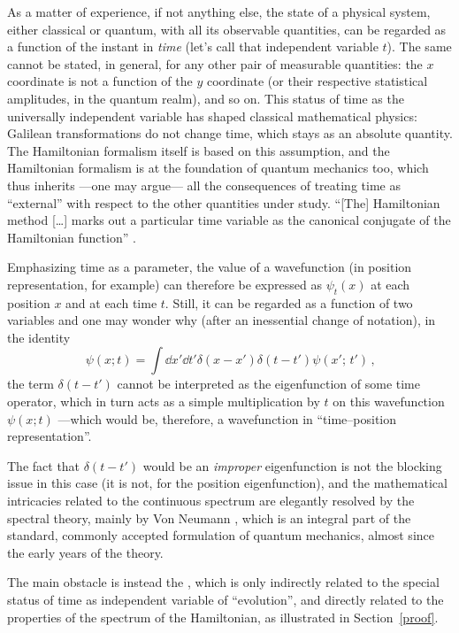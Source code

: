 As a matter of experience, if not anything else,
the state of a physical system, either classical or quantum,
with all its observable quantities,
can be regarded as a function of the instant in \emph{time}
(let's call that independent variable $t$).
The same cannot be stated, in general, for any other pair of measurable quantities:
the $x$ coordinate is not a function of the $y$ coordinate
(or their respective statistical amplitudes, in the quantum realm),
and so on.
This status of time as the universally independent variable
has shaped classical mathematical physics: Galilean transformations
do not change time, which stays as an absolute quantity.
The Hamiltonian formalism itself is based on this assumption,
and the Hamiltonian formalism is at the foundation of quantum mechanics too,
which thus inherits ---one may argue--- all the consequences of
treating time as ``external'' with respect to the other quantities under study.
``[The] Hamiltonian method [\dots] marks out a particular time variable
as the canonical conjugate of the Hamiltonian function'' \parencite{DiracLagrangian}.

Emphasizing time as a parameter, the value of a wavefunction
(in position representation, for example)
can therefore be expressed as $\psi_{t}(x)$ at each position $x$
and at each time $t$.
Still, it can be regarded as a function of two variables
and one may wonder why (after an inessential change of notation),
in the identity
\begin{equation}\label{eq:diracdeltaxt}
  \psi(x; t) = \int \dd{x'}\dd{t'} \delta(x-x')\delta(t-t') \psi(x';\, t') \,\text{,}
\end{equation}
the term $\delta(t-t')$ cannot be interpreted as the eigenfunction of some time operator,
which in turn acts as a simple multiplication by $t$ on this
wavefunction $\psi(x; t)$ ---which would be, therefore, a wavefunction in ``time--position representation''.

The fact that $\delta(t-t')$ would be an \emph{improper} eigenfunction
is not the blocking issue in this case (it is not, for the position eigenfunction),
and the mathematical intricacies related to the continuous spectrum are
elegantly resolved by the spectral theory, mainly by Von Neumann
\parencite{VonNeumann}, which is an integral part of the standard, commonly accepted
formulation of quantum mechanics, almost since the early years of the theory.

The main obstacle is instead the ,
which is only indirectly related to the special status of time
as independent variable of ``evolution'', and
directly related to the properties of the spectrum of the {Hamiltonian},
as illustrated in Section~\ref{proof}.

